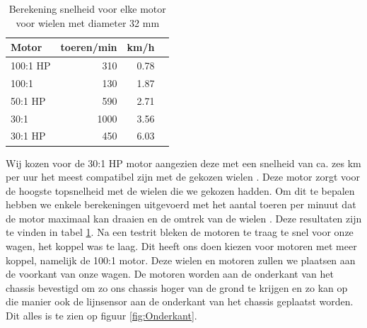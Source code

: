 \documentclass[a4paper,kulak]{kulakarticle}
\begin{document}
\begin{table}
	\centering
	
	\begin{tabular}{|l|r|r|r|}\hline
		  \textbf{Motor}&	\textbf{toeren/min} &	\textbf{km/h}	\\\hline
		100:1 HP&	310&	0.78\\\hline
		100:1&	130&	1.87 	\\\hline
		50:1 HP&	590&	2.71 \\\hline
		30:1&	1000&	3.56	\\\hline
		30:1 HP&	450&	6.03 	\\\hline
	\end{tabular}
	\caption{Berekening snelheid voor elke motor voor wielen met diameter 32 mm}\label{MotorenTab}

\end{table}
Wij kozen voor de 30:1 HP motor aangezien deze met een snelheid van ca. zes km per uur het meest compatibel zijn met de gekozen wielen . Deze motor zorgt voor de hoogste topsnelheid met de wielen die we gekozen hadden. Om dit te bepalen hebben we enkele berekeningen uitgevoerd met het aantal toeren per minuut dat de motor maximaal kan draaien en de omtrek van de wielen \cite{converter}. Deze resultaten zijn te vinden in tabel \ref{MotorenTab}. Na een testrit bleken de motoren te traag te snel voor onze wagen, het koppel was te laag. Dit heeft ons doen kiezen voor motoren met meer koppel, namelijk de 100:1 motor. Deze wielen en motoren zullen we plaatsen aan de voorkant van onze wagen. De motoren worden aan de onderkant van het chassis bevestigd om zo ons chassis hoger van de grond te krijgen en zo kan op die manier ook de lijnsensor aan de onderkant van het chassis geplaatst worden. Dit alles is te zien op figuur \ref{fig:Onderkant}.  
\end{document}
